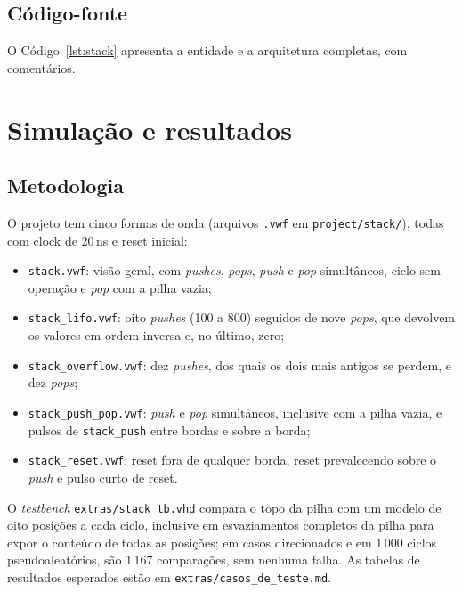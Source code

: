 \subsection{Código-fonte}

O Código~\ref{lst:stack} apresenta a entidade e a arquitetura completas, com comentários.


\section{Simulação e resultados}

\subsection{Metodologia}

O projeto tem cinco formas de onda (arquivos \texttt{.vwf} em \texttt{project/stack/}), todas com clock de 20\,ns e reset inicial:

\begin{itemize}
  \item \texttt{stack.vwf}: visão geral, com \textit{pushes}, \textit{pops}, \textit{push} e \textit{pop} simultâneos, ciclo sem operação e \textit{pop} com a pilha vazia;
  \item \texttt{stack\_lifo.vwf}: oito \textit{pushes} (100 a 800) seguidos de nove \textit{pops}, que devolvem os valores em ordem inversa e, no último, zero;
  \item \texttt{stack\_overflow.vwf}: dez \textit{pushes}, dos quais os dois mais antigos se perdem, e dez \textit{pops};
  \item \texttt{stack\_push\_pop.vwf}: \textit{push} e \textit{pop} simultâneos, inclusive com a pilha vazia, e pulsos de \texttt{stack\_push} entre bordas e sobre a borda;
  \item \texttt{stack\_reset.vwf}: reset fora de qualquer borda, reset prevalecendo sobre o \textit{push} e pulso curto de reset.
\end{itemize}

O \textit{testbench} \texttt{extras/stack\_tb.vhd} compara o topo da pilha com um modelo de oito posições a cada ciclo, inclusive em esvaziamentos completos da pilha para expor o conteúdo de todas as posições; em casos direcionados e em 1\,000 ciclos pseudoaleatórios, são 1\,167 comparações, sem nenhuma falha. As tabelas de resultados esperados estão em \texttt{extras/casos\_de\_teste.md}.

